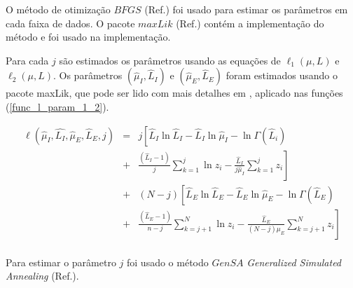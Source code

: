 \documentclass[remotesensing,article,submit,moreauthors,pdftex]{Definitions/mdpi}
\begin{document}
O método de otimização $BFGS$ (Ref.\cite{nw_2006}) foi usado para estimar os parâmetros em cada faixa de dados. O pacote $maxLik$ (Ref.\cite{ht_2011}) contém a implementação do método e foi usado na implementação.
 
Para cada $j$ são estimados os parâmetros usando as equações de $\ell_1(\mu, L)$ e $\ell_2(\mu, L)$. Os parâmetros $(\hat{\mu}_I, \hat{L}_I)$ e $(\hat{\mu}_E, \hat{L}_E)$ foram estimados usando o pacote maxLik, que pode ser lido com mais detalhes em \cite{ht_2011}, aplicado nas funções (\ref{func_l_param_1_2}).


\begin{equation}\label{cap_acf_16}
 \begin{array}{lll}
\ell(\hat{\mu}_I, \hat{L_I},\hat{\mu}_E, \hat{L}_E, j)&=&j\left[  \hat{L}_I\ln \hat{L}_I -\hat{L}_I \ln \hat{\mu}_I -\ln \Gamma(\hat{L}_i) \right. \\
&+& \left.\frac{(\hat{L}_I  - 1)}{j} \sum_{k=1}^{j}  \ln z_{i}  -\frac{\hat{L}_I}{j\hat{\mu}_I} \sum_{k=1}^{j}   z_i\right] \\
                                               &+&(N-j)\left[\hat{L}_E\ln \hat{L}_E -\hat{L}_E \ln \hat{\mu}_E-\ln \Gamma(\hat{L}_E)\right. \\
                                               &+&\left. \frac{(\hat{L}_E - 1)}{n-j} \sum_{k=j+1}^{N}\ln z_{i}-\frac{\hat{L}_E}{(N-j)\mu_E} \sum_{k=j+1}^{N}z_i\right] \\
 \end{array}
 \end{equation}

Para estimar o  parâmetro $j$ foi usado o método $GenSA$ \textit{Generalized Simulated Annealing} (Ref.\cite{xgsh}).
\end{document}
